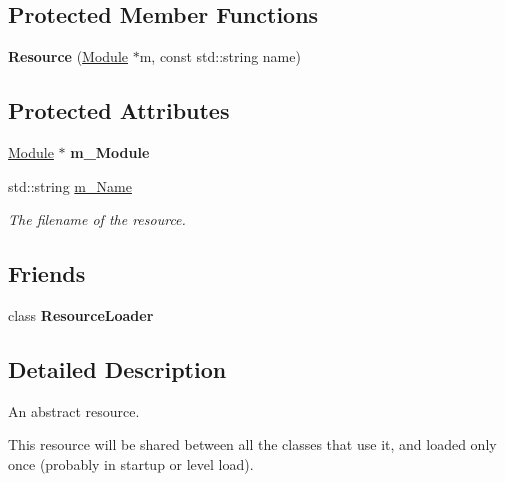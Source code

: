 \subsection*{Protected Member Functions}
\begin{DoxyCompactItemize}
\item 
\mbox{\label{classTarbora_1_1Resource_a3ffc8c75f081f3fceed3a9c8cb99c295}} 
{\bfseries Resource} (\hyperlink{classTarbora_1_1Module}{Module} $\ast$m, const std\+::string name)
\end{DoxyCompactItemize}
\subsection*{Protected Attributes}
\begin{DoxyCompactItemize}
\item 
\mbox{\label{classTarbora_1_1Resource_a13c33cb798d0940924047d0f28617d7a}} 
\hyperlink{classTarbora_1_1Module}{Module} $\ast$ {\bfseries m\+\_\+\+Module}
\item 
\mbox{\label{classTarbora_1_1Resource_ac66c4d8338373309735cfab7e8f13d97}} 
std\+::string \hyperlink{classTarbora_1_1Resource_ac66c4d8338373309735cfab7e8f13d97}{m\+\_\+\+Name}
\begin{DoxyCompactList}\small\item\em The filename of the resource. \end{DoxyCompactList}\end{DoxyCompactItemize}
\subsection*{Friends}
\begin{DoxyCompactItemize}
\item 
\mbox{\label{classTarbora_1_1Resource_a685a33b83a13f36aceea3ff940994ac9}} 
class {\bfseries Resource\+Loader}
\end{DoxyCompactItemize}


\subsection{Detailed Description}
An abstract resource. 

This resource will be shared between all the classes that use it, and loaded only once (probably in startup or level load).

